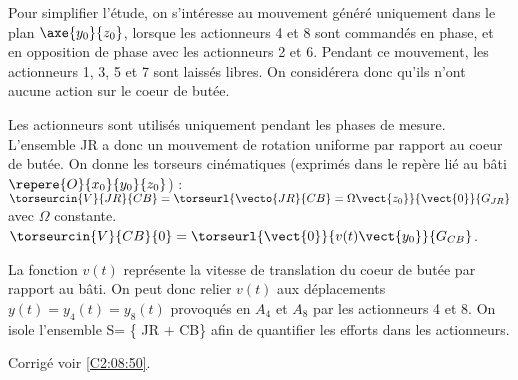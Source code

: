 Pour simplifier l’étude, on s’intéresse au mouvement généré uniquement dans le plan 
$\axe{y_0}{z_0}$, lorsque les actionneurs 4 et 8 sont commandés en phase, et en opposition de
phase avec les actionneurs 2 et 6. Pendant ce mouvement, les actionneurs 1, 3, 5 et 7 sont
laissés libres. On considérera donc qu’ils n’ont aucune action sur le coeur de butée.

\ifprof
\else
\fi

Les actionneurs sont utilisés uniquement pendant les phases de mesure. L’ensemble JR a
donc un mouvement de rotation uniforme par rapport au coeur de butée. On donne les
torseurs cinématiques (exprimés dans le repère lié au bâti $\repere{O}{x_0}{y_0}{z_0}$) : 
$\torseurcin{V}{JR}{CB} =\torseurl{\vecto{JR}{CB}=\Omega\vect{z_0}}{\vect{0}}{G_{JR}}$ avec $\Omega$ constante.
$\torseurcin{V}{CB}{0} =\torseurl{\vect{0}}{v(t)\vect{y_0}}{G_{CB}}$.

La fonction $v(t)$ représente la vitesse de translation du coeur de butée par rapport au bâti.
On peut donc relier $v(t)$ aux déplacements $y(t) = y_4(t) = y_8(t)$ provoqués en $A_4$ et $A_8$
par les actionneurs 4 et 8.
On isole l’ensemble S= \{ JR + CB\} afin de quantifier les efforts dans les actionneurs.

\ifprof
\else
\fi

\ifprof
\else
\fi

\ifprof
\else
\fi

\ifprof
\else
\fi



\ifprof
\else
\begin{flushright}
\footnotesize{Corrigé voir \ref{C2:08:50}.}
\end{flushright}%
\fi